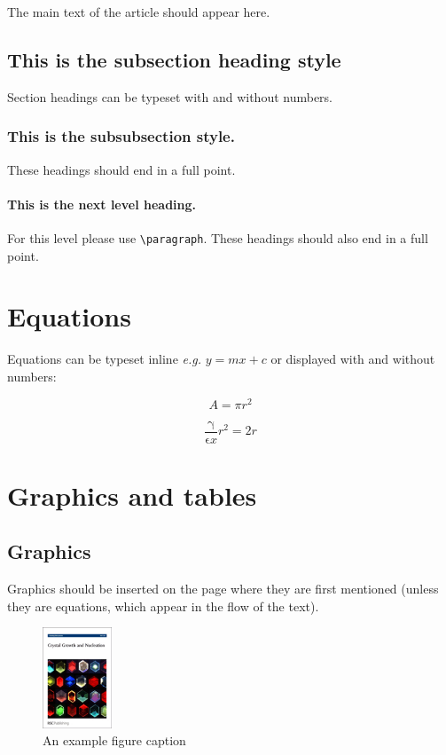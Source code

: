 \documentclass[8.5pt,twoside]{article}
\begin{document}
The main text of the article\cite{Mena2000} should appear here.

\subsection{This is the subsection heading style}
Section headings can be typeset with and without numbers.\cite{Abernethy2003}

\subsubsection{This is the subsubsection style.~~} These headings should end in a full point.  

\paragraph{This is the next level heading.~~} For this level please use \texttt{\textbackslash paragraph}. These headings should also end in a full point.

\section{Equations}

Equations can be typeset inline \textit{e.g.} $ y = mx + c$ or displayed with and without numbers:

 \[ A = \pi r^2 \]

\begin{equation}
  \frac{\mathrm{\gamma}}{\mathrm{\epsilon}x} r^2 = 2r
\end{equation}

\section{Graphics and tables}
\subsection{Graphics}
Graphics should be inserted on the page where they are first mentioned (unless they are equations, which appear in the flow of the text).\cite{Cotton1999}

\begin{figure}[h]
\centering
  \includegraphics[height=3cm]{example}
  \caption{An example figure caption}
  \label{fgr:example}
\end{figure}
\end{document}
